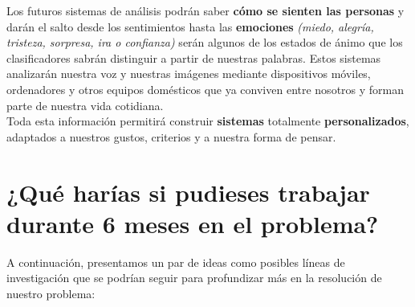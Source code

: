 \documentclass[a4paper,12pt]{report}
\begin{document}
Los futuros sistemas de análisis podrán saber \textbf{cómo se sienten las personas} y darán el salto desde los sentimientos hasta las \textbf{emociones} \textit{(miedo, alegría, tristeza, sorpresa, ira o confianza)} serán algunos de los estados de ánimo que los clasificadores sabrán distinguir a partir de nuestras palabras. Estos sistemas analizarán nuestra voz y nuestras imágenes mediante dispositivos móviles, ordenadores y otros equipos domésticos que ya conviven entre nosotros y forman parte de nuestra vida cotidiana. 
\vspace{2mm}\\
Toda esta información permitirá construir \textbf{sistemas} totalmente \textbf{personalizados}, adaptados a nuestros gustos, criterios y a nuestra forma de pensar. 


\clearpage


\section{¿Qué harías si pudieses trabajar durante 6 meses en el problema?}

{\setlength{\parindent}{0cm}
A continuación, presentamos un par de ideas como posibles líneas de investigación que se podrían seguir para profundizar más en la resolución de nuestro problema: }
\vspace{4mm}
\end{document}
